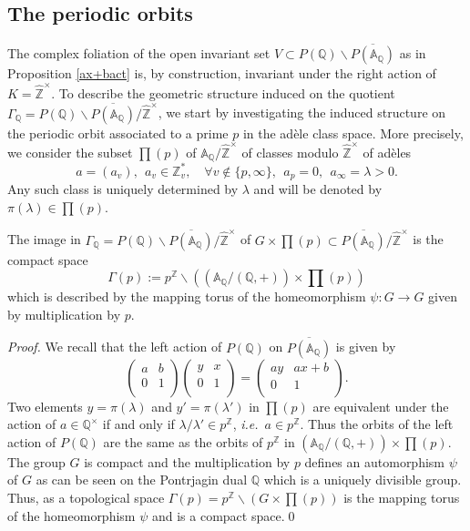 \documentclass[graybox, envcountsect%
]{svmult}
\def\A{{\mathbb A}}
\def\Q{{\mathbb Q}}
\def\Z{{\mathbb Z}}
\def\hatz{{\hat\Z^\times}}
\def\gaq{{\Gamma_\Q}}
\newcommand{\ie}{{\it i.e.\/}\ }
\begin{document}
\subsection{The periodic orbits}\label{subsec:5.3}

The complex foliation of the open invariant set $V\subset P(\Q)\backslash
\overline{P(\A_\Q)}$ as in Proposition \ref{ax+bact} is, by construction, invariant under the right action of $K=\hatz$. To describe the geometric structure induced on the quotient $\gaq = 	P(\Q)\backslash
\overline{P(\A_\Q)}/\hatz$,  we start by investigating the induced structure on the  periodic orbit associated to a prime $p$ in the ad\`ele class space.\newline
 More precisely, we consider the  subset $\prod(p)$ of $\A_\Q/\hatz$  of classes modulo $\hatz$ of ad\`eles 
$$
a=(a_v), \ \ a_v\in \Z_v^*,\quad \forall v\notin\{p,\infty\}, \ \ a_p=0, \ \ a_\infty=\lambda >0.
$$
Any such  class is uniquely determined by $\lambda$  and will be denoted by $\pi(\lambda)\in \prod(p)$.

\begin{lemma}\label{lemper}The image in  $\gaq = 	P(\Q)\backslash
\overline{P(\A_\Q)}/\hatz$ of $G\times \prod(p)\subset \overline{P(\A_\Q)}/\hatz$ is the compact space
	\begin{equation}\label{gammap}
\Gamma(p):=p^\Z\backslash\left((\A_\Q/(\Q,+))\times \prod(p)\right)
\end{equation}
which is described by the mapping torus of the homeomorphism $\psi:G\to G$ given by multiplication by $p$.
\end{lemma}
\begin{proof} We recall that the left action of $P(\Q)$ on $\overline{P(\A_\Q)}$ is given by
$$
\left(
\begin{array}{cc}
 a & b \\
 0 & 1 \\
\end{array}
\right)\left(
\begin{array}{cc}
 y & x \\
 0 & 1 \\
\end{array}
\right)=
\left(
\begin{array}{cc}
 ay & a x +b\\
 0 & 1 \\
\end{array}
\right).
$$
 Two elements $y=\pi(\lambda)$ and $ y'=\pi(\lambda')$ in $ \prod(p)$ are equivalent under the action of $a\in\Q^\times$ if and only if $\lambda/\lambda'\in p^\Z$, \ie  $a\in p^\Z$.
Thus the orbits of the left action of $P(\Q)$ are the same as the orbits of $p^\Z$ in $(\A_\Q/(\Q,+))\times \prod(p)$. The group $G$ is compact and the multiplication by $p$ defines an automorphism $\psi$ of $G$ as can be seen on the Pontrjagin dual $\Q$ which is a uniquely divisible group. Thus, as a topological space $\Gamma(p)=p^\Z\backslash\left(G\times \prod(p)\right)$ is the mapping torus of the homeomorphism $\psi$ and is a compact space.\qed\end{proof} 
 
\end{document}

